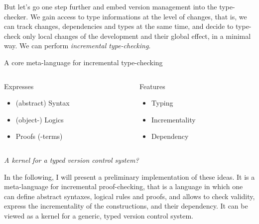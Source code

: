\documentclass[ignorenonframetext,red]{beamer}
\begin{document}
But let's go one step further and embed version management into the
type-checker. We gain access to type informations at the level of
changes, that is, we can track changes, dependencies and types at the
same time, and decide to type-check only local changes of the
development and their global effect, in a minimal way. We can perform
\emph{incremental type-checking}.

\begin{frame}{A core meta-language for incremental type-checking}
  \begin{columns}[t]
    \begin{column}{0.5\textwidth}
      \begin{block}{Expresses}
        \begin{itemize}
        \item (abstract) Syntax
        \item (object-) Logics
        \item Proofs (-terms)
        \end{itemize}
      \end{block}
    \end{column}
    \begin{column}{0.5\textwidth}
      \begin{block}{Features}
        \begin{itemize}
        \item Typing
        \item Incrementality
        \item Dependency
        \end{itemize}
      \end{block}
    \end{column}
  \end{columns}
  \vspace{2em}
  \begin{center}
    \emph{A kernel for a typed version control system?}
  \end{center}
\end{frame}

In the following, I will present a preliminary implementation of these
ideas. It is a meta-language for incremental proof-checking, that is a
language in which one can define abstract syntaxes, logical rules and
proofs, and allows to check validity, express the incrementality of
the constructions, and their dependency. It can be viewed as a kernel
for a generic, typed version control system.
\end{document}
